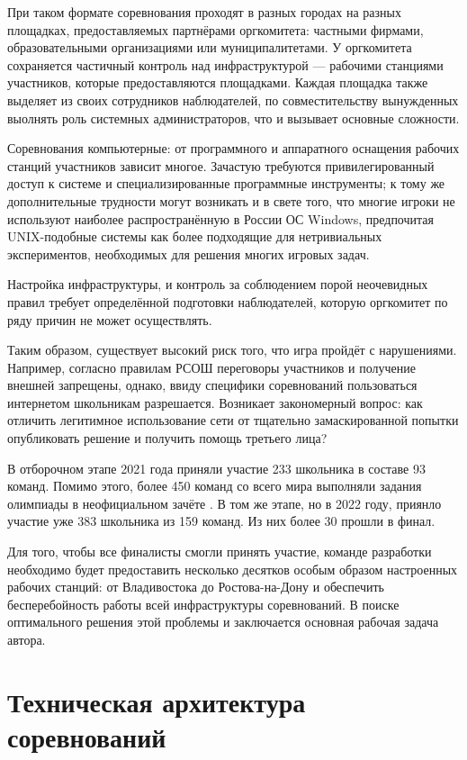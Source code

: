 При таком формате соревнования проходят в разных городах на разных площадках, предоставляемых партнёрами оргкомитета: частными фирмами, образовательными организациями или муниципалитетами. У оргкомитета сохраняется частичный контроль над инфраструктурой --- рабочими станциями участников, которые предоставляются площадками. Каждая площадка также выделяет из своих сотрудников наблюдателей, по совместительству вынужденных выолнять роль системных администраторов, что и вызывает основные сложности.

Соревнования компьютерные: от программного и аппаратного оснащения рабочих станций участников зависит многое. Зачастую требуются привилегированный доступ к системе и специализированные программные инструменты; к тому же дополнительные трудности могут возникать и в свете того, что многие игроки не используют наиболее распространённую в России ОС Windows, предпочитая UNIX-подобные системы как более подходящие для нетривиальных экспериментов, необходимых для решения многих игровых задач.

Настройка инфраструктуры, и контроль за соблюдением порой неочевидных правил требует определённой подготовки наблюдателей, которую оргкомитет по ряду причин не может осуществлять.

Таким образом, существует высокий риск того, что игра пройдёт с нарушениями. Например, согласно правилам РСОШ переговоры участников и получение внешней запрещены, однако, ввиду специфики соревнований пользоваться интернетом школьникам разрешается. Возникает закономерный вопрос: как отличить легитимное использование сети от тщательно замаскированной попытки опубликовать решение и получить помощь третьего лица?

В отборочном этапе 2021 года приняли участие 233 школьника в составе 93 команд. Помимо этого, более 450 команд со всего мира выполняли задания олимпиады в неофициальном зачёте \cite{Ugra21}. В том же этапе, но в 2022 году, приянло участие уже 383 школьника из 159 команд. Из них более 30 прошли в финал.

Для того, чтобы все финалисты смогли принять участие, команде разработки необходимо будет предоставить несколько десятков особым образом настроенных рабочих станций: от Владивостока до Ростова-на-Дону и обеспечить бесперебойность работы всей инфраструктуры соревнований. В поиске оптимального решения этой проблемы и заключается основная рабочая задача автора.



\section{Техническая архитектура соревнований}

